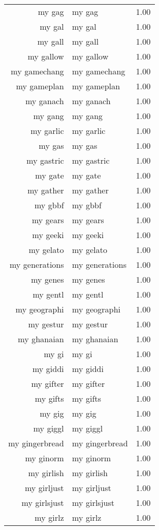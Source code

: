 \begin{table}[ht]
\begin{tabular}{rlr}
  my gag & my gag & 1.00 \\ 
  my gal & my gal & 1.00 \\ 
  my gall & my gall & 1.00 \\ 
  my gallow & my gallow & 1.00 \\ 
  my gamechang & my gamechang & 1.00 \\ 
  my gameplan & my gameplan & 1.00 \\ 
  my ganach & my ganach & 1.00 \\ 
  my gang & my gang & 1.00 \\ 
  my garlic & my garlic & 1.00 \\ 
  my gas & my gas & 1.00 \\ 
  my gastric & my gastric & 1.00 \\ 
  my gate & my gate & 1.00 \\ 
  my gather & my gather & 1.00 \\ 
  my gbbf & my gbbf & 1.00 \\ 
  my gears & my gears & 1.00 \\ 
  my geeki & my geeki & 1.00 \\ 
  my gelato & my gelato & 1.00 \\ 
  my generations & my generations & 1.00 \\ 
  my genes & my genes & 1.00 \\ 
  my gentl & my gentl & 1.00 \\ 
  my geographi & my geographi & 1.00 \\ 
  my gestur & my gestur & 1.00 \\ 
  my ghanaian & my ghanaian & 1.00 \\ 
  my gi & my gi & 1.00 \\ 
  my giddi & my giddi & 1.00 \\ 
  my gifter & my gifter & 1.00 \\ 
  my gifts & my gifts & 1.00 \\ 
  my gig & my gig & 1.00 \\ 
  my giggl & my giggl & 1.00 \\ 
  my gingerbread & my gingerbread & 1.00 \\ 
  my ginorm & my ginorm & 1.00 \\ 
  my girlish & my girlish & 1.00 \\ 
  my girljust & my girljust & 1.00 \\ 
  my girlsjust & my girlsjust & 1.00 \\ 
  my girlz & my girlz & 1.00 \\ 

\end{tabular}
\end{table}
